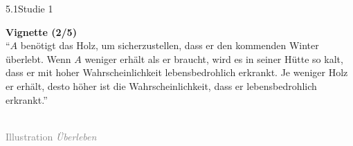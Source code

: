 \documentclass[xcolor=table,9pt,aspectratio=169]{beamer}
\begin{document}
\begin{frame}{\vspace*{10mm}5.1\hspace*{1em}Studie 1}
\begin{multicols}{2}
   \textbf{Vignette (2/5)}\\
   \medskip
   \enquote{$A$ benötigt das Holz, um sicherzustellen, dass er den kommenden Winter überlebt. Wenn $A$ weniger erhält als er braucht, wird es in seiner Hütte so kalt, dass er mit hoher Wahrscheinlichkeit lebensbedrohlich erkrankt. Je weniger Holz er erhält, desto höher ist die Wahrscheinlichkeit, dass er lebensbedrohlich erkrankt.}
   \vfill
   \begin{center}
      \\
      \textcolor{gray}{Illustration \textit{Überleben}}
   \end{center}
\end{multicols}
\end{frame}
\end{document}
